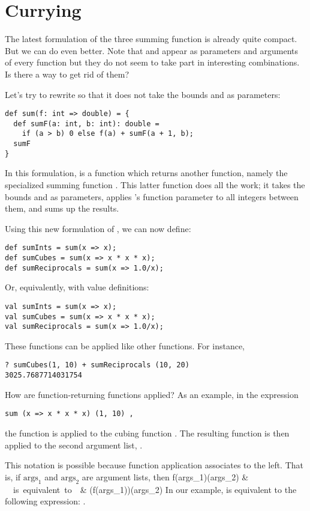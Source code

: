\documentclass[a4paper,12pt,twoside,titlepage]{book}
\begin{document}
\section{Currying}

The latest formulation of the three summing function is already quite
compact. But we can do even better. Note that
 and  appear as parameters and arguments of every function
but they do not seem to take part in interesting combinations. Is
there a way to get rid of them?

Let's try to rewrite  so that it does not take the bounds
 and  as parameters:
\begin{lstlisting}
def sum(f: int => double) = {
  def sumF(a: int, b: int): double = 
    if (a > b) 0 else f(a) + sumF(a + 1, b);
  sumF
}
\end{lstlisting}
In this formulation,  is a function which returns another
function, namely the specialized summing function . This
latter function does all the work; it takes the bounds  and
 as parameters, applies 's function parameter  to all
integers between them, and sums up the results. 

Using this new formulation of , we can now define:
\begin{lstlisting}
def sumInts = sum(x => x);
def sumCubes = sum(x => x * x * x);
def sumReciprocals = sum(x => 1.0/x);
\end{lstlisting}
Or, equivalently, with value definitions:
\begin{lstlisting}
val sumInts = sum(x => x);
val sumCubes = sum(x => x * x * x);
val sumReciprocals = sum(x => 1.0/x);
\end{lstlisting}
These functions can be applied like other functions. For instance,
\begin{lstlisting}
? sumCubes(1, 10) + sumReciprocals (10, 20)
3025.7687714031754
\end{lstlisting}
How are function-returning functions applied? As an example, in the expression
\begin{lstlisting}
sum (x => x * x * x) (1, 10) ,
\end{lstlisting}
the function  is applied to the cubing function 
. The resulting function is then 
applied to the second argument list, .

This notation is possible because function application associates to the left.
That is, if $\mbox{args}_1$ and $\mbox{args}_2$ are argument lists, then 
f(\mbox{args}_1)(\mbox{args}_2) & \ \ \mbox{is equivalent to}\ \ & (f(\mbox{args}_1))(\mbox{args}_2)
\eda
In our example,  is equivalent to the
following expression:
.
\end{document}
